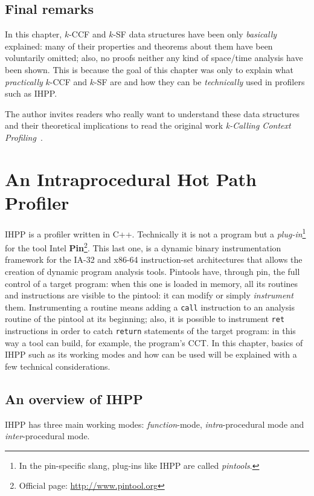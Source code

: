 \documentclass[a4paper,10pt]{report}
\begin{document}
\section{Final remarks}

In this chapter, $k$-CCF and $k$-SF data structures have been only \emph{basically} explained: many of their properties and theorems about them have been voluntarily omitted;
also, no proofs neither any kind of space\slash time analysis have been shown.
This is because the goal of this chapter was only to explain what \emph{practically} $k$-CCF and $k$-SF are and how they can be \emph{technically} used in profilers such as IHPP.

The author invites readers who really want to understand these data structures and their theoretical implications to read the original work \emph{k-Calling Context Profiling}~\cite{kccf}.


\chapter{An Intraprocedural Hot Path Profiler}

IHPP is a profiler written in C++. Technically it is not a program but
 a \emph{plug-in}\footnote{In the pin-specific slang,
plug-ins like IHPP are called \emph{pintools}.} for the tool
Intel \textbf{Pin}\footnote{Official page: \url{http://www.pintool.org}}.
This last one, is a dynamic binary instrumentation framework for the IA-32 and x86-64 instruction-set architectures that allows the creation of dynamic program analysis tools.
Pintools have, through pin, the full control of a target program:
when this one is loaded in memory, all its routines and instructions are visible
to the pintool: it can modify or simply \emph{instrument} them.
Instrumenting a routine means adding a \verb|call| instruction to an analysis
routine of the pintool at its beginning; also, it is possible to instrument \verb|ret| instructions
in order to catch \verb|return| statements of the target program:
in this way a tool can build, for example, the program's CCT.
In this chapter, basics of IHPP such as its working modes and how can be used will be explained with a few technical considerations.

\section{An overview of IHPP}

IHPP has three main working modes: \emph{function}-mode, \emph{intra}-procedural mode and \emph{inter}-procedural mode.
\end{document}
